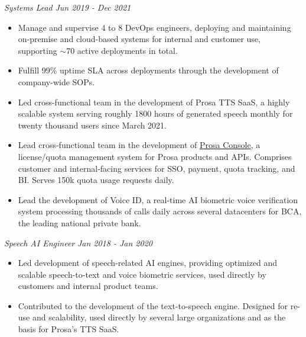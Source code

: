 \documentclass{article}
\begin{document}
\emph{Systems Lead} \hfill \emph{Jun 2019 - Dec 2021}\\
\vspace{-3mm}
\begin{itemize}[align=left, left=0pt..1em, itemsep=-2pt]
  \item Manage and supervise 4 to 8 DevOps engineers, deploying and
    maintaining on-premise and cloud-based systems for internal and customer
    use, supporting $\sim$70 active deployments in total.
  \item Fulfill 99\% uptime SLA across deployments through the development of
    company-wide SOPs.
  \item Led cross-functional team in the development of Prosa TTS SaaS, a
    highly scalable system serving roughly 1800 hours of generated speech
    monthly for twenty thousand users since March 2021.
  \item Lead cross-functional team in the development of
    \href{https://console2.prosa.ai}{Prosa Console}, a license/quota management
    system for Prosa products and APIs. Comprises customer and internal-facing
    services for SSO, payment, quota tracking, and BI. Serves 150k quota usage
    requests daily.
  \item Lead the development of Voice ID, a real-time AI biometric voice
    verification system processing thousands of calls daily across several
    datacenters for BCA, the leading national private bank.
\end{itemize}
\vspace{-1mm}

\emph{Speech AI Engineer} \hfill \emph{Jan 2018 - Jan 2020}\\
\vspace{-3mm}
\begin{itemize}[align=left, left=0pt..1em, itemsep=-2pt]
  \item Led development of speech-related AI engines, providing
    optimized and scalable speech-to-text and voice biometric services, used
    directly by customers and internal product teams.
  \item Contributed to the development of the text-to-speech engine. Designed
    for re-use and scalability, used directly by several large organizations
    and as the basis for Prosa's TTS SaaS.
\end{itemize}
\end{document}
